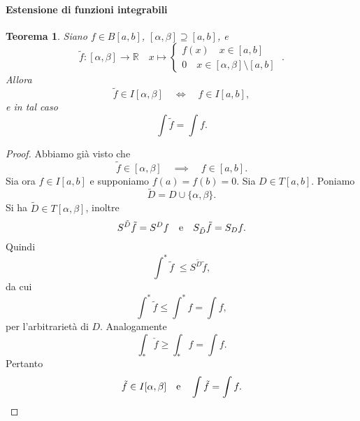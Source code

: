 \documentclass{article}
\theoremstyle{plain}
\newtheorem{thm}{Teorema}[section]
\theoremstyle{definition}
\theoremstyle{remark}
\begin{document}
\vspace{10pt}

\paragraph{Estensione di funzioni integrabili}
\begin{bxthm}
\begin{thm}\label{teorprec}
    Siano $f\in B[a,b]$, $[\alpha,\beta]\supseteq[a,b]$, e
    \[        \tilde{f}:[\alpha,\beta]\to\mathbb{R}\quad 
        x\mapsto\begin{cases}
            f(x)\quad x\in[a,b]\\
            0\quad x\in[\alpha,\beta]\setminus[a,b]
        \end{cases}\;.\]
    Allora 
    \[\tilde{f}\in I[\alpha,\beta]\quad\iff\quad f\in I[a,b],\]
    e in tal caso 
    \[\int\tilde{f}=\int f.\]
\end{thm}
\end{bxthm}
\begin{proof}
    Abbiamo già visto che 
    \[\tilde{f}\in[\alpha,\beta]\quad\implies\quad f\in[a,b]. \]
    Sia ora $f\in I[a,b]$ e supponiamo $f(a)=f(b)=0$.
    Sia $D\in T[a,b]$. 
    Poniamo \[\tilde{D}=D\cup\{\alpha,\beta\}.\]
    Si ha $\tilde{D}\in T[\alpha,\beta]$, 
    inoltre 
    \[S^{\tilde{D}}\tilde{f}=S^{D}f\quad\textup{e}\quad S_{\tilde{D}}\tilde{f}=S_{D}f.\]
    Quindi 
    \[\int^{*}\tilde{f}\; \leq S^{\tilde{D}}\tilde{f},\]
    da cui 
    \[\int^*\tilde{f}\leq\int^*f=\int f, \]
    per l'arbitrarietà di $D$. 
    Analogamente 
    \[\int_*\check{f}\geq\int_*f=\int f.\]
    Pertanto 
    \[\tilde{f}\in I[\alpha,\beta]\quad\textup{e}\quad\int\tilde{f}=\int f.\]
\end{proof}

\vspace{10pt}
\end{document}
